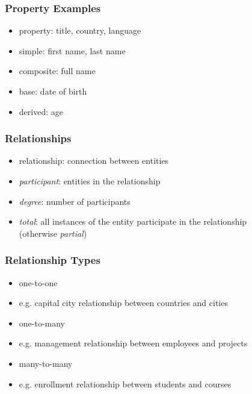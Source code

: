 \documentclass[dvipsnames]{beamer}
\begin{document}
\begin{frame}
  \frametitle{Property Examples}

  \begin{itemize}
    \item property: title, country, language

    \pause
    \medskip
    \item simple: first name, last name
    \item composite: full name

    \pause
    \medskip
    \item base: date of birth
    \item derived: age
  \end{itemize}
\end{frame}

\begin{frame}
  \frametitle{Relationships}

  \begin{itemize}
    \item \alert{relationship}: connection between entities

    \medskip
    \item \emph{participant}: entities in the relationship
    \item \emph{degree}: number of participants
    \item \emph{total}: all instances of the entity
      participate in the relationship\\
      (otherwise \emph{partial})
  \end{itemize}
\end{frame}

\begin{frame}
  \frametitle{Relationship Types}

  \begin{itemize}
    \item \alert{one-to-one}
    \item e.g. capital city relationship between countries and cities

    \pause
    \medskip
    \item \alert{one-to-many}
    \item e.g. management relationship between employees and projects

    \pause
    \medskip
    \item \alert{many-to-many}
    \item e.g. enrollment relationship between students and courses
  \end{itemize}
\end{frame}
\end{document}
